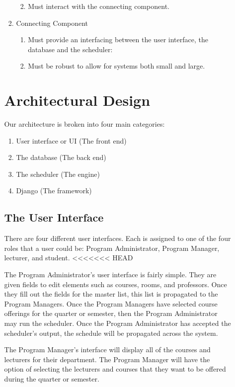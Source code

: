 \documentclass[12pt]{article}
\begin{document}
\begin{enumerate}
\begin{enumerate}
\begin{enumerate}
\begin{enumerate}
\begin{enumerate}
	    \end{enumerate}
	\item Must interact with the connecting component.
     \end{enumerate}
\item Connecting Component
      \begin{enumerate}
      \item Must provide an interfacing between the user interface, the database and the scheduler:
    \item Must be robust to allow for systems both small and large.
     \end{enumerate}
\end{enumerate}

\section{Architectural Design} %
Our architecture is broken into four main categories:
\begin{enumerate}
\item User interface or UI (The front end)
\item The database  (The back end)
\item The scheduler (The engine)
\item Django (The framework)
\end{enumerate}

\subsection{The User Interface}
There are four different user interfaces. Each is assigned to one of the four roles that a user could be: Program Administrator, Program Manager, lecturer, and student.
<<<<<<< HEAD

The Program Administrator's user interface is fairly simple. They are given fields to edit elements such as courses, rooms, and professors. Once they fill out the fields for the master list, this list is propagated to the Program Managers. Once the Program Managers have selected course offerings for the quarter or semester, then the Program Administrator may run the scheduler. Once the Program Administrator has accepted the scheduler's output, the schedule will be propagated across the system.

The Program Manager's interface will display all of the courses and lecturers for their department. The Program Manager will have the option of selecting the lecturers and courses that they want to be offered during the quarter or semester.


\end{enumerate}
\end{enumerate}
\end{document}
